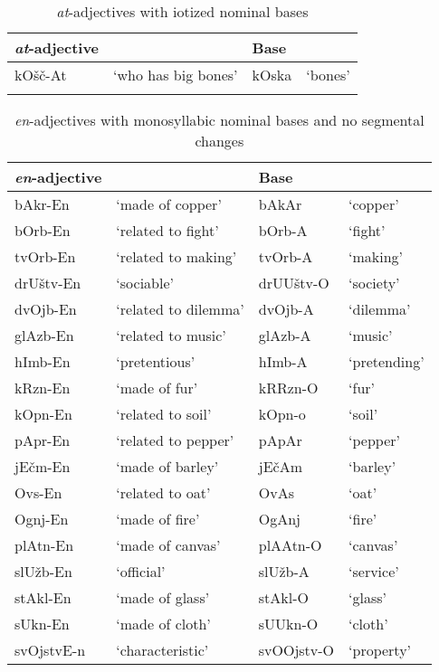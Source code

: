 \documentclass[output=paper]{langsci/langscibook}
\begin{document}
\begin{table}          
\caption{\textit{at}-adjectives with iotized nominal bases}          
\label{tabapp7}          
 \begin{tabular}{ l l l l}          
\lsptoprule            
 \textit{at}-adjective &  & Base & \\
\hline
kOšč-At & `who has big bones' & kOska & `bones' \\
 \lspbottomrule        
 \end{tabular}          
\end{table}           

\begin{table}      
\caption{\textit{en}-adjectives with monosyllabic nominal bases and no segmental changes}          
\label{tabapp8}          
 \begin{tabular}{ l l l l}          
\lsptoprule            
 \textit{en}-adjective &  & Base & \\
\hline
bAkr-En & `made of copper' & bAkAr & `copper'  
\\  bOrb-En & `related to fight' & bOrb-A & `fight' 
\\  tvOrb-En & `related to making' & tvOrb-A & `making' 
\\  drUštv-En & `sociable' & drUUštv-O & `society'
\\  dvOjb-En & `related to dilemma' & dvOjb-A & `dilemma' 
\\  glAzb-En & `related to music' & glAzb-A & `music' 
\\  hImb-En & `pretentious' & hImb-A & `pretending' 
\\  kRzn-En & `made of fur' & kRRzn-O & `fur' 
\\  kOpn-En & `related to soil' & kOpn-o & `soil' 
\\  pApr-En & `related to pepper' & pApAr & `pepper' 
\\  jEčm-En & `made of barley' & jEčAm & `barley' 
\\  Ovs-En & `related to oat' & OvAs & `oat' 
\\  Ognj-En & `made of fire' & OgAnj & `fire' 
\\  plAtn-En & `made of canvas' & plAAtn-O & `canvas' 
\\  slUžb-En & `official' & slUžb-A & `service' 
\\  stAkl-En & `made of glass' & stAkl-O & `glass' 
\\  sUkn-En & `made of cloth' & sUUkn-O & `cloth' 
\\  svOjstvE-n  & `characteristic' & svOOjstv-O & `property' 

\end{tabular}
\end{table}
\end{document}
